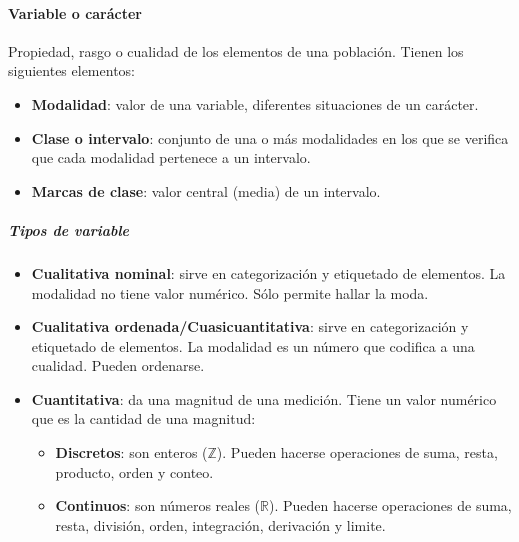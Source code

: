 \paragraph{Variable o carácter} Propiedad, rasgo o cualidad de los elementos de una población. Tienen los siguientes elementos:
\begin{itemize}[itemsep=0pt,parsep=0pt,topsep=0pt,partopsep=0pt]
    \item \textbf{Modalidad}: valor de una variable, diferentes situaciones de un carácter.
    \item\textbf{Clase o intervalo}: conjunto de una o más modalidades en los que se verifica que cada modalidad pertenece a un intervalo.
    \item\textbf{Marcas de clase}: valor central (media) de un intervalo.
\end{itemize}
\subparagraph{Tipos de variable}
\begin{itemize}[itemsep=0pt,parsep=0pt,topsep=0pt,partopsep=0pt]
    \item \textbf{Cualitativa nominal}: sirve en categorización y etiquetado de elementos. La modalidad no tiene valor numérico. Sólo permite hallar la moda.
    \item\textbf{Cualitativa ordenada/Cuasicuantitativa}: sirve en categorización y etiquetado de elementos. La modalidad es un número que codifica a una cualidad. Pueden ordenarse.
    \item\textbf{Cuantitativa}: da una magnitud de una medición. Tiene un valor numérico que es la cantidad de una magnitud:
    \begin{itemize}[itemsep=0pt,parsep=0pt,topsep=0pt,partopsep=0pt]
        \item \textbf{Discretos}: son enteros ($\mathds{Z}$). Pueden hacerse operaciones de suma, resta, producto, orden y conteo.
        \item\textbf{Continuos}: son números reales ($\mathds{R}$). Pueden hacerse operaciones de suma, resta, división, orden, integración, derivación y limite.
    \end{itemize}
\end{itemize}
